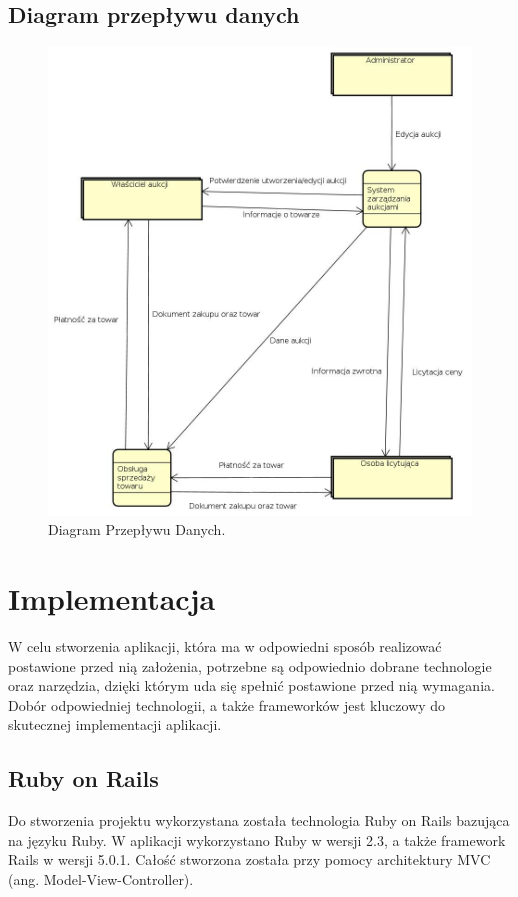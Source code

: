 \documentclass[brudnopis]{xmgr}
\begin{document}
\section{Diagram przepływu danych}
\begin{figure}[!tbh]
\centering
\includegraphics[width=\linewidth]{fig/DFD}
\caption{Diagram Przepływu Danych.}
\end{figure}

\chapter{Implementacja}
W celu stworzenia aplikacji, która ma w odpowiedni sposób realizować postawione przed nią
założenia, potrzebne są odpowiednio dobrane technologie oraz narzędzia, dzięki którym uda się 
spełnić postawione przed nią wymagania. Dobór odpowiedniej technologii, a także frameworków 
jest kluczowy do skutecznej implementacji aplikacji.

\section{Ruby on Rails}
Do stworzenia projektu wykorzystana została technologia Ruby on Rails bazująca na języku Ruby.
W aplikacji wykorzystano Ruby w wersji 2.3, a także framework Rails w wersji 5.0.1. Całość stworzona
została przy pomocy architektury MVC (ang. Model-View-Controller).
\end{document}
